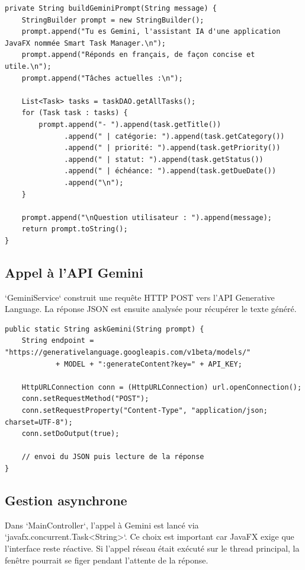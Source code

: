 \documentclass[11pt,a4paper]{article}
\begin{document}
\begin{lstlisting}[style=javaStyle,caption={Construction du contexte IA}]
private String buildGeminiPrompt(String message) {
    StringBuilder prompt = new StringBuilder();
    prompt.append("Tu es Gemini, l'assistant IA d'une application JavaFX nommée Smart Task Manager.\n");
    prompt.append("Réponds en français, de façon concise et utile.\n");
    prompt.append("Tâches actuelles :\n");

    List<Task> tasks = taskDAO.getAllTasks();
    for (Task task : tasks) {
        prompt.append("- ").append(task.getTitle())
              .append(" | catégorie: ").append(task.getCategory())
              .append(" | priorité: ").append(task.getPriority())
              .append(" | statut: ").append(task.getStatus())
              .append(" | échéance: ").append(task.getDueDate())
              .append("\n");
    }

    prompt.append("\nQuestion utilisateur : ").append(message);
    return prompt.toString();
}
\end{lstlisting}

\subsection{Appel à l'API Gemini}

`GeminiService` construit une requête HTTP POST vers l'API Generative Language. La réponse JSON est ensuite analysée pour récupérer le texte généré.

\begin{lstlisting}[style=javaStyle,caption={Appel réseau vers Gemini}]
public static String askGemini(String prompt) {
    String endpoint = "https://generativelanguage.googleapis.com/v1beta/models/"
            + MODEL + ":generateContent?key=" + API_KEY;

    HttpURLConnection conn = (HttpURLConnection) url.openConnection();
    conn.setRequestMethod("POST");
    conn.setRequestProperty("Content-Type", "application/json; charset=UTF-8");
    conn.setDoOutput(true);

    // envoi du JSON puis lecture de la réponse
}
\end{lstlisting}

\subsection{Gestion asynchrone}

Dans `MainController`, l'appel à Gemini est lancé via `javafx.concurrent.Task<String>`. Ce choix est important car JavaFX exige que l'interface reste réactive. Si l'appel réseau était exécuté sur le thread principal, la fenêtre pourrait se figer pendant l'attente de la réponse.
\end{document}

